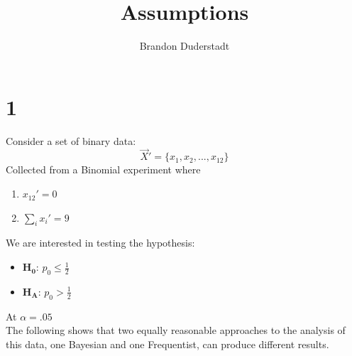 \documentclass{article}
\title{Assumptions}
\author{Brandon Duderstadt}
\begin{document}
  \maketitle
  \section*{1}
    Consider a set of binary data:
    $$\vec X' = \{x_1, x_2, ..., x_{12}\}$$
    Collected from a Binomial experiment where
    \begin{enumerate}
      \item $x_{12}' = 0$
      \item $\sum_i x_i' = 9$
    \end{enumerate}
    We are interested in testing the hypothesis:
    \begin{itemize}
      \item[] $\mathbf{H_0}$: $p_0 \leq \frac{1}{2}$
      \item[] $\mathbf{H_A}$: $p_0 > \frac{1}{2}$
    \end{itemize}
    At $\alpha=.05$\\[12pt]
    The following shows that two equally reasonable approaches to the analysis of this data, one Bayesian and one Frequentist, can produce different results.
\end{document}
